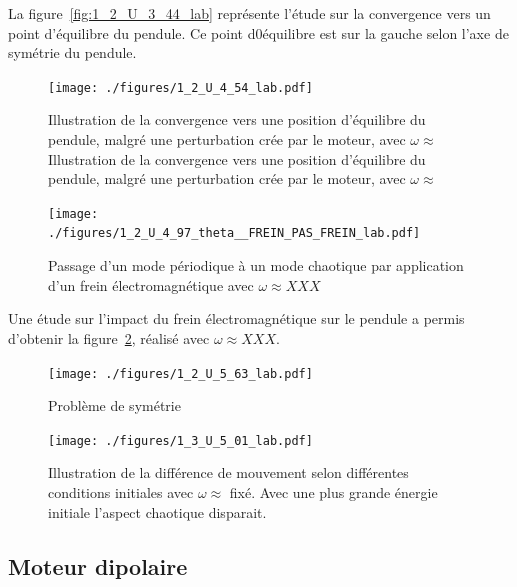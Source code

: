 \documentclass[a4paper,12pt,oneside]{article}
\begin{document}
La figure~\ref{fig:1_2_U_3_44_lab} représente l'étude sur la convergence vers un point d'équilibre du pendule. Ce point d0équilibre est sur la gauche selon l'axe de symétrie du pendule.

\begin{figure}[h!]
  \begin{center}
  \texttt{[image: ./figures/1\_2\_U\_4\_54\_lab.pdf]}
  \caption{Illustration de la convergence vers une position d'équilibre du pendule, malgré une perturbation crée par le moteur, avec $\omega \approx$Illustration de la convergence vers une position d'équilibre du pendule, malgré une perturbation crée par le moteur, avec $\omega \approx$} \label{fig:1_2_U_4_54_lab}
  \end{center}
\end{figure}

\begin{figure}[h!]
  \begin{center}
  \texttt{[image: ./figures/1\_2\_U\_4\_97\_theta\_\_FREIN\_PAS\_FREIN\_lab.pdf]}
  \caption{Passage d'un mode périodique à un mode chaotique par application d'un frein électromagnétique avec $\omega \approx XXX$} \label{fig:1_2_U_4_97_theta__FREIN_PAS_FREIN_lab}
  \end{center}
\end{figure}

Une étude sur l'impact du frein électromagnétique sur le pendule a permis d'obtenir la figure~\ref{fig:1_2_U_4_97_theta__FREIN_PAS_FREIN_lab}, réalisé avec $\omega \approx XXX$.

\begin{figure}[h!]
  \begin{center}
  \texttt{[image: ./figures/1\_2\_U\_5\_63\_lab.pdf]}
  \caption{Problème de symétrie} \label{fig:1_2_U_5_63_lab}
  \end{center}
\end{figure}

\begin{figure}[h!]
  \begin{center}
  \texttt{[image: ./figures/1\_3\_U\_5\_01\_lab.pdf]}
  \caption{Illustration de la différence de mouvement selon différentes conditions initiales avec $\omega\approx$ fixé. Avec une plus grande énergie initiale l'aspect chaotique disparait.} \label{fig:1_3_U_5_01_lab}
  \end{center}
\end{figure}

\subsection{Moteur dipolaire}
\end{document}

